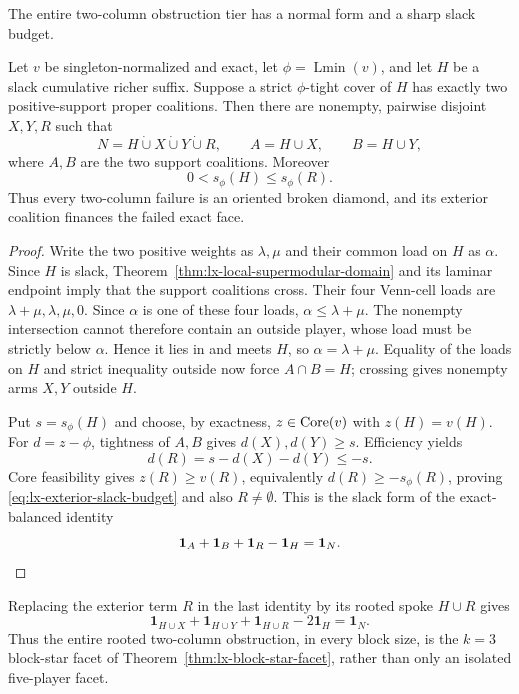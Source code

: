 The entire two-column obstruction tier has a normal form and a sharp slack
budget.

\begin{theorem}
\label{thm:lx-two-column-normal-form}
Let $v$ be singleton-normalized and exact, let
$\phi=\operatorname{Lmin}(v)$, and let $H$ be a slack cumulative richer
suffix. Suppose a strict $\phi$-tight cover of $H$ has exactly two
positive-support proper coalitions. Then there are nonempty, pairwise
disjoint $X,Y,R$ such that
\[
 N=H\mathbin{\dot\cup}X\mathbin{\dot\cup}Y\mathbin{\dot\cup}R,
 \qquad A=H\cup X,\qquad B=H\cup Y,
\]
where $A,B$ are the two support coalitions. Moreover
\[
 0<s_\phi(H)\leq s_\phi(R).                         \tag{ESB}
 \label{eq:lx-exterior-slack-budget}
\]
Thus every two-column failure is an oriented broken diamond, and its exterior
coalition finances the failed exact face.
\end{theorem}

\begin{proof}
Write the two positive weights as $\lambda,\mu$ and their common load on
$H$ as $\alpha$. Since $H$ is slack, Theorem~\ref{thm:lx-local-supermodular-domain}
and its laminar endpoint imply that the support coalitions cross. Their four
Venn-cell loads are $\lambda+\mu,\lambda,\mu,0$. Since $\alpha$ is one of
these four loads, $\alpha\leq\lambda+\mu$. The nonempty intersection cannot
therefore contain an outside player, whose load must be strictly below
$\alpha$. Hence it lies in and meets $H$, so $\alpha=\lambda+\mu$. Equality of the loads on
$H$ and strict inequality outside now force $A\cap B=H$; crossing gives
nonempty arms $X,Y$ outside $H$.

Put $s=s_\phi(H)$ and choose, by exactness, $z\in\operatorname{Core}(v)$ with
$z(H)=v(H)$. For $d=z-\phi$, tightness of $A,B$ gives
$d(X),d(Y)\geq s$. Efficiency yields
\[
 d(R)=s-d(X)-d(Y)\leq-s.
\]
Core feasibility gives $z(R)\geq v(R)$, equivalently
$d(R)\geq-s_\phi(R)$, proving \eqref{eq:lx-exterior-slack-budget} and also
$R\ne\emptyset$. This is the slack form of the exact-balanced identity
\[
 \mathbf1_A+\mathbf1_B+\mathbf1_R-\mathbf1_H=\mathbf1_N. \qedhere
\]
\end{proof}

Replacing the exterior term $R$ in the last identity by its rooted spoke
$H\cup R$ gives
\[
 \mathbf1_{H\cup X}+\mathbf1_{H\cup Y}+\mathbf1_{H\cup R}
 -2\mathbf1_H=\mathbf1_N.
\]
Thus the entire rooted two-column obstruction, in every block size, is the
$k=3$ block-star facet of Theorem~\ref{thm:lx-block-star-facet}, rather than
only an isolated five-player facet.

